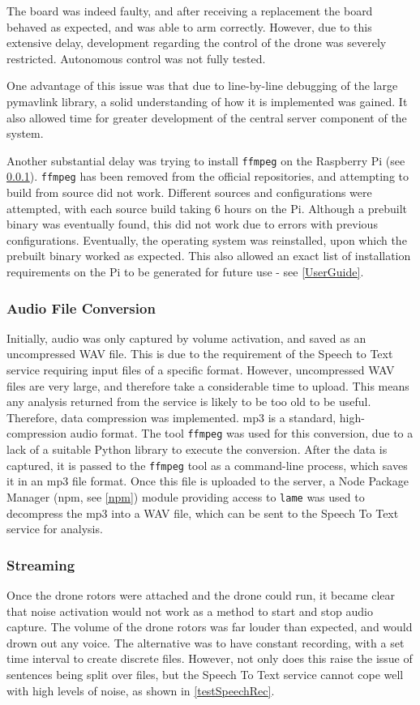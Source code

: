\documentclass{article}
\begin{document}
The board was indeed faulty, and after receiving a replacement the board behaved as expected, and was able to arm correctly. However, due to this extensive delay, development regarding the control of the drone was severely restricted. Autonomous control was not fully tested.

One advantage of this issue was that due to line-by-line debugging of the large pymavlink library, a solid understanding of how it is implemented was gained. It also allowed time for greater development of the central server component of the system.

Another substantial delay was trying to install \texttt{ffmpeg} on the Raspberry Pi (see \ref{AudioFile}). \texttt{ffmpeg} has been removed from the official repositories, and attempting to build from source did not work. Different sources and configurations were attempted, with each source build taking 6 hours on the Pi. Although a prebuilt binary was eventually found, this did not work due to errors with previous configurations. Eventually, the operating system was reinstalled, upon which the prebuilt binary worked as expected. This also allowed an exact list of installation requirements on the Pi to be generated for future use - see \ref{UserGuide}. 

\subsubsection{Audio File Conversion}\label{AudioFile}
Initially, audio was only captured by volume activation, and saved as an uncompressed WAV file. This is due to the requirement of the Speech to Text service requiring input files of a specific format. However, uncompressed WAV files are very large, and therefore take a considerable time to upload. This means any analysis returned from the service is likely to be too old to be useful. Therefore, data compression was implemented. mp3 is a standard, high-compression audio format. The tool \texttt{ffmpeg} was used for this conversion, due to a lack of a suitable Python library to execute the conversion. After the data is captured, it is passed to the \texttt{ffmpeg} tool as a command-line process, which saves it in an mp3 file format. Once this file is uploaded to the server, a Node Package Manager (npm, see \ref{npm}) module\cite{npmlame} providing access to \texttt{lame} was used to decompress the mp3 into a WAV file, which can be sent to the Speech To Text service for analysis. 

\subsubsection{Streaming}\label{Streaming}
Once the drone rotors were attached and the drone could run, it became clear that noise activation would not work as a method to start and stop audio capture. The volume of the drone rotors was far louder than expected, and would drown out any voice. The alternative was to have constant recording, with a set time interval to create discrete files. However, not only does this raise the issue of sentences being split over files, but the Speech To Text service cannot cope well with high levels of noise, as shown in \ref{testSpeechRec}. 
\end{document}
